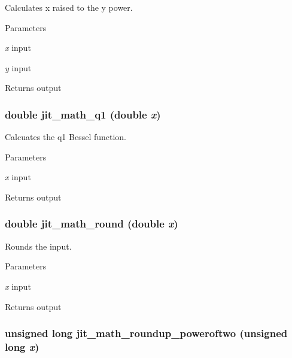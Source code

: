 Calculates x raised to the y power. 
\begin{DoxyParams}{Parameters}
\item[{\em x}]input \item[{\em y}]input \end{DoxyParams}
\begin{DoxyReturn}{Returns}
output 
\end{DoxyReturn}
\hypertarget{group__mathmod_ga3c3fe23905fbc9b6899c00f2fdaab1df}{
\subsubsection[{jit\_\-math\_\-q1}]{\setlength{\rightskip}{0pt plus 5cm}double jit\_\-math\_\-q1 (double {\em x})}}
\label{group__mathmod_ga3c3fe23905fbc9b6899c00f2fdaab1df}


Calcuates the q1 Bessel function. 
\begin{DoxyParams}{Parameters}
\item[{\em x}]input \end{DoxyParams}
\begin{DoxyReturn}{Returns}
output 
\end{DoxyReturn}
\hypertarget{group__mathmod_ga5b29bd3b76679c7b0b2e4594444cb4bd}{
\subsubsection[{jit\_\-math\_\-round}]{\setlength{\rightskip}{0pt plus 5cm}double jit\_\-math\_\-round (double {\em x})}}
\label{group__mathmod_ga5b29bd3b76679c7b0b2e4594444cb4bd}


Rounds the input. 
\begin{DoxyParams}{Parameters}
\item[{\em x}]input \end{DoxyParams}
\begin{DoxyReturn}{Returns}
output 
\end{DoxyReturn}
\hypertarget{group__mathmod_ga00cb634371131410e9f89ccc7f27c6d2}{
\subsubsection[{jit\_\-math\_\-roundup\_\-poweroftwo}]{\setlength{\rightskip}{0pt plus 5cm}unsigned long jit\_\-math\_\-roundup\_\-poweroftwo (unsigned long {\em x})}}
\label{group__mathmod_ga00cb634371131410e9f89ccc7f27c6d2}


